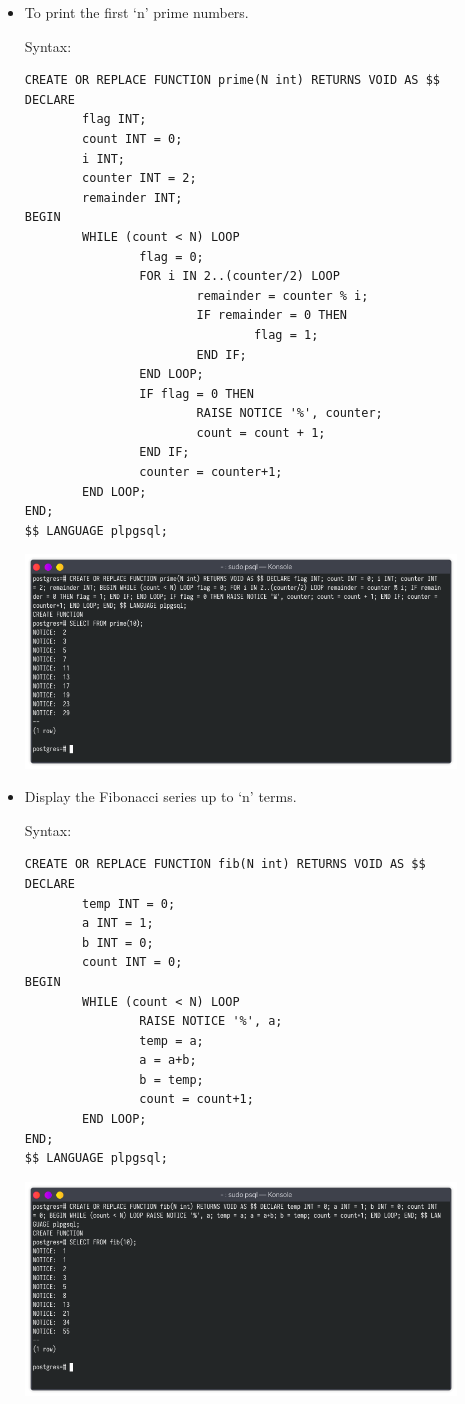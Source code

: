 \documentclass[13pt,oneside]{book}
\begin{document}
\begin{itemize}
\item
To print the first `n' prime numbers.
 
 
Syntax:
\begin{verbatim}
CREATE OR REPLACE FUNCTION prime(N int) RETURNS VOID AS $$
DECLARE
        flag INT;
        count INT = 0;
        i INT;
        counter INT = 2;
        remainder INT;
BEGIN
        WHILE (count < N) LOOP
                flag = 0;
                FOR i IN 2..(counter/2) LOOP
                        remainder = counter % i;
                        IF remainder = 0 THEN
                                flag = 1;
                        END IF;
                END LOOP;
                IF flag = 0 THEN
                        RAISE NOTICE '%', counter;
                        count = count + 1;
                END IF;
                counter = counter+1;
        END LOOP;
END;
$$ LANGUAGE plpgsql;

\end{verbatim}
\includegraphics[width=0.9\textwidth]{img/p8/ss1.png}


\item
Display the Fibonacci series up to `n' terms.
 
 
Syntax:
\begin{verbatim}
CREATE OR REPLACE FUNCTION fib(N int) RETURNS VOID AS $$ 
DECLARE
        temp INT = 0;
        a INT = 1;
        b INT = 0;
        count INT = 0;
BEGIN
        WHILE (count < N) LOOP
                RAISE NOTICE '%', a;
                temp = a;
                a = a+b;
                b = temp;
                count = count+1;
        END LOOP;
END;
$$ LANGUAGE plpgsql;

\end{verbatim}
\includegraphics[width=0.9\textwidth]{img/p8/ss2.png}



\end{itemize}
\end{document}
